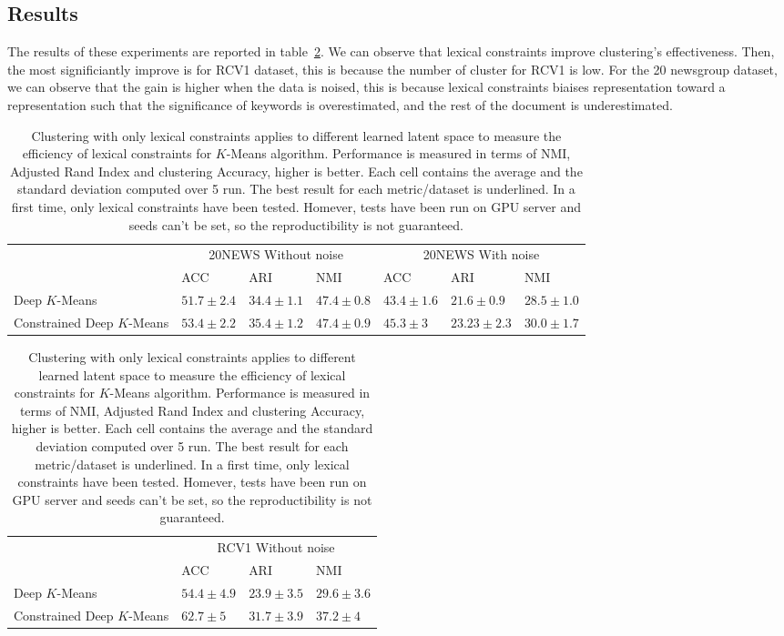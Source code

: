 \subsection{Results}
The results of these experiments are reported in table~\ref{tab:res}. We can  
observe that lexical constraints improve clustering's effectiveness. Then,
the most significiantly improve is for RCV1 dataset, this is because the number
of cluster for RCV1 is low. For the 20 newsgroup dataset, we can observe that 
the gain is higher when the data is noised, this is because lexical constraints
biaises representation toward a representation such that the significance of 
keywords is overestimated, and the rest of the document is underestimated.   

\begin{table}[!h]
\centering
  \begin{tabular}{| l | l | l | l | l | l | l | }
    \hline
    & \multicolumn{3}{|c|}{20NEWS Without noise} & \multicolumn{3}{|c|}{20NEWS With noise}  \\
    & ACC            &ARI             & NMI            & ACC           & ARI           &NMI            \\ \hline
Deep $K$-Means &$51.7\pm 2.4$&$34.4\pm 1.1$&$47.4\pm 0.8$&$43.4\pm 1.6$&$21.6\pm 0.9$&$28.5\pm 1.0$\\ \hline
Constrained Deep $K$-Means&\boldmath$53.4\pm 2.2$&\boldmath$35.4\pm 1.2$&\boldmath$47.4\pm 0.9$&\boldmath$45.3\pm 3$&\boldmath$23.23\pm 2.3$&\boldmath$30.0\pm 1.7$\\ \hline
  \end{tabular}
\begin{tabular}{| l | l | l | l | }
    \hline
     & \multicolumn{3}{|c|}{RCV1 Without noise}  \\
    &ACC            & ARI           &NMI  \\ \hline
Deep $K$-Means &$54.4\pm 4.9$&$23.9\pm 3.5$&$29.6\pm 3.6$
\\ \hline
Constrained Deep $K$-Means&\boldmath$62.7\pm 5$&\boldmath$31.7\pm 3.9$&\boldmath$37.2\pm 4$
\\ \hline
  \end{tabular}
\caption{\label{tab:res}Clustering with only lexical constraints applies to 
different learned latent space to measure the efficiency of lexical constraints
for $K$-Means algorithm. Performance is measured in terms of NMI, Adjusted Rand 
Index and clustering Accuracy, higher is better. Each cell contains the average
and the standard deviation computed over 5 run. The best result for each 
metric/dataset is underlined. In a first time, only lexical constraints have 
been tested. Homever, tests have been run on GPU server and seeds can't
be set, so the reproductibility is not guaranteed.}
\end{table}
